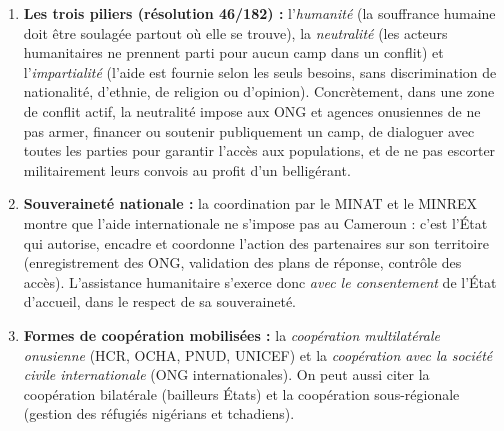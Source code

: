 \documentclass[11pt]{article}
\begin{document}
\begin{corrige}
\begin{enumerate}
    \item \textbf{Les trois piliers (résolution 46/182) :} l'\emph{humanité} (la souffrance humaine doit être soulagée partout où elle se trouve), la \emph{neutralité} (les acteurs humanitaires ne prennent parti pour aucun camp dans un conflit) et l'\emph{impartialité} (l'aide est fournie selon les seuls besoins, sans discrimination de nationalité, d'ethnie, de religion ou d'opinion). Concrètement, dans une zone de conflit actif, la neutralité impose aux ONG et agences onusiennes de ne pas armer, financer ou soutenir publiquement un camp, de dialoguer avec toutes les parties pour garantir l'accès aux populations, et de ne pas escorter militairement leurs convois au profit d'un belligérant.
    \item \textbf{Souveraineté nationale :} la coordination par le MINAT et le MINREX montre que l'aide internationale ne s'impose pas au Cameroun : c'est l'État qui autorise, encadre et coordonne l'action des partenaires sur son territoire (enregistrement des ONG, validation des plans de réponse, contrôle des accès). L'assistance humanitaire s'exerce donc \emph{avec le consentement} de l'État d'accueil, dans le respect de sa souveraineté.
    \item \textbf{Formes de coopération mobilisées :} la \emph{coopération multilatérale onusienne} (HCR, OCHA, PNUD, UNICEF) et la \emph{coopération avec la société civile internationale} (ONG internationales). On peut aussi citer la coopération bilatérale (bailleurs États) et la coopération sous-régionale (gestion des réfugiés nigérians et tchadiens).
\end{enumerate}
\end{corrige}
\end{document}
